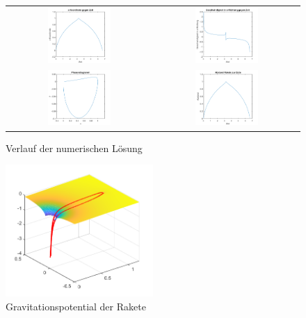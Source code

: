 \documentclass[11pt,a4paper]{article}
\begin{document}
\begin{figure}
\begin{tabular}{cc}
  \includegraphics[width=0.45\textwidth]{bild4} &  
  \includegraphics[width=0.45\textwidth]{bild5} \\
  \includegraphics[width=0.45\textwidth]{bild6} &  
  \includegraphics[width=0.45\textwidth]{bild7} \\
  
  \end{tabular}
\caption{Verlauf der numerischen L\"osung}
  \end{figure}
  
  \begin{figure}
  \includegraphics[width=0.5\textwidth]{bild8}
  \caption{Gravitationspotential der Rakete}
  \end{figure}
  
\end{document}
